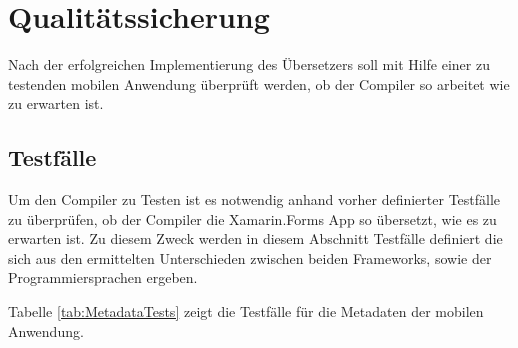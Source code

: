 \chapter{Qualitätssicherung}
\label{chap:Qualitätssicherung}

Nach der erfolgreichen Implementierung des Übersetzers soll mit Hilfe einer zu testenden mobilen Anwendung überprüft werden,  ob der Compiler so arbeitet wie zu erwarten ist.  
\section{Testfälle}
Um den Compiler zu Testen ist es notwendig anhand vorher definierter Testfälle zu überprüfen, ob der Compiler die Xamarin.Forms App so übersetzt, wie es zu erwarten ist.   Zu diesem Zweck werden in diesem Abschnitt Testfälle definiert die sich aus den ermittelten Unterschieden zwischen beiden Frameworks,  sowie der Programmiersprachen ergeben. 

Tabelle \ref{tab:MetadataTests} zeigt die Testfälle für die Metadaten der mobilen Anwendung. 



